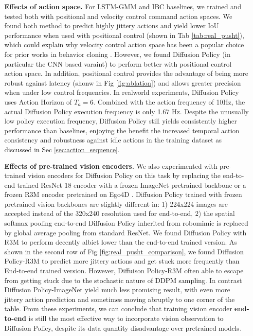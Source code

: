 \textbf{Effects of action space.} For LSTM-GMM and IBC baselines, we trained and tested both with positional and velocity control command action spaces. We found both method to predict highly jittery actions and yield lower IoU performance when used with positional control (shown in Tab \ref{tab:real_pusht}), which could explain why velocity control action space has been a popular choice for prior works in behavior cloning \cite{ibc,robomimic,bet}. However, we found Diffusion Policy (in particular the CNN based varaint) to perform better with positional control action space. In addition, positional control provides the advantage of being more robust against latency (shonw in Fig \ref{fig:ablation}) and allows greater precision when under low control frequencies. In realworld experiments, Diffusion Policy uses Action Horizon of $T_a=6$. Combined with the action frequency of 10Hz, the actual Diffusion Policy execution frequency is only 1.67 Hz. Despite the unusually low policy execution frequency, Diffusion Policy still yields consistently higher performance than baselines, enjoying the benefit the increased temporal action consistency and robustness against idle actions in the training dataset as discussed in Sec \ref{sec:action_sequence}.

\textbf{Effects of pre-trained vision encoders.}
We also experimented with pre-trained vision encoders for Diffusion Policy on this task by replacing the end-to-end trained ResNet-18 encoder with a frozen ImageNet \cite{deng2009imagenet} pretrained backbone or a frozen R3M encoder \cite{nair2022r3m} pretrained on Ego4D \cite{grauman2022ego4d}. Diffusion Policy trained with frozen pretrained vision backbones are slightly different in: 1) 224x224 images are accepted instead of the 320x240 resolution used for end-to-end, 2) the spatial softmax pooling end-to-end Diffusion Policy inherited from robomimic \cite{robomimic} is replaced by global average pooling from standard ResNet. We found Diffusion Policy with R3M to perform decently albiet lower than the end-to-end trained version. As shown in the second row of Fig \ref{fig:real_pusht_comparison}, we found Diffusion Policy-R3M to predict more jittery actions and get stuck more frequently than End-to-end trained version. However, Diffuison Policy-R3M often able to escape from getting stuck due to the stochastic nature of DDPM sampling. In contrast Diffusion Policy-ImageNet yield much less promising result, with even more jittery action prediction and sometimes moving abruptly to one corner of the table. From these experiments, we can conclude that training vision encoder \textbf{end-to-end} is still the most effective way to incorporate vision observation to Diffusion Policy, despite its data quantity disadvantage over pretrained models.

